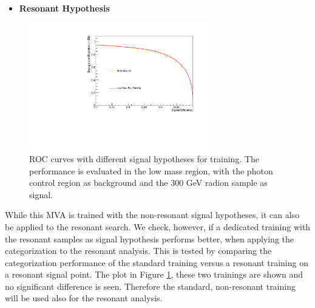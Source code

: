 \begin{itemize}
\item \textbf{Resonant Hypothesis}
\end{itemize}

\begin{figure}[h]
  \centering
  \includegraphics[width=0.7\textwidth]{figures/sec-cats/mva/ROC_res}\hfil
  \caption{ROC curves with different signal hypotheses for training. The performance is evaluated in the low mass region, with the photon control region as background and the 300 GeV radion sample as signal.}
  \label{fig:mva_cc_res}
\end{figure}

While this MVA is trained with the non-resonant signal hypotheses, it can also be applied to the resonant search. 
We check, however, if a dedicated training with the resonant samples as signal hypothesis performs better, when applying the categorization to the resonant analysis.  
This is tested by comparing the categorization performance of the standard training versus a resonant training on a resonant signal point. 
The plot in Figure \ref{fig:mva_cc_res}, these two trainings are shown and no significant difference is seen. 
Therefore the standard, non-resonant training will be used also for the resonant analysis. 




